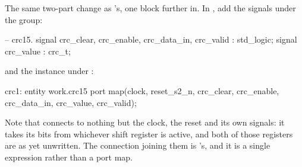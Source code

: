 The same two-part change as 's, one block further in. In
, add the signals under the  group:

\begin{vhdlcode}
    -- crc15.
    signal crc_clear, crc_enable, crc_data_in, crc_valid : std_logic;
    signal crc_value                                     : crc_t;
\end{vhdlcode}

and the instance under :

\begin{vhdlcode}
    crc1: entity work.crc15
        port map(clock, reset_s2_n, crc_clear, crc_enable, crc_data_in, crc_value, crc_valid);
\end{vhdlcode}

Note that  connects to nothing but the clock, the reset and its own signals: it takes its
bits from whichever shift register is active, and both of those registers are as yet unwritten. The
connection joining them is 's, and it is a single expression rather than a port map.
